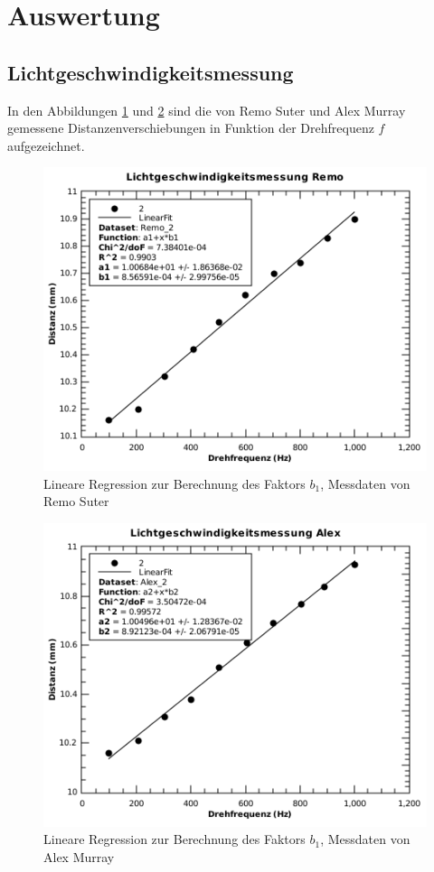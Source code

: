 \section{Auswertung}

\subsection{Lichtgeschwindigkeitsmessung}

In den Abbildungen \ref{fig:x-f-remo} und \ref{fig:x-f-alex} sind die von Remo
Suter  und  Alex  Murray gemessene  Distanzenverschiebungen  in  Funktion  der
Drehfrequenz $f$ aufgezeichnet.

\begin{figure}[H]
    \center
    \includegraphics[width=.65\textwidth]{images/x-f-remo.pdf}
    \caption{Lineare Regression zur Berechnung des Faktors $b_1$, Messdaten von Remo Suter}
    \label{fig:x-f-remo}
\end{figure}

\begin{figure}[H]
    \center
    \includegraphics[width=.65\textwidth]{images/x-f-alex.pdf}
    \caption{Lineare Regression zur Berechnung des Faktors $b_1$, Messdaten von Alex Murray}
    \label{fig:x-f-alex}
\end{figure}

